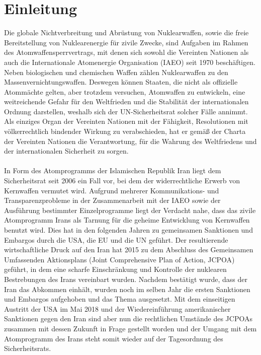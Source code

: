 \documentclass[a4paper,11pt]{article}
\begin{document}
	\section{Einleitung}
Die globale Nichtverbreitung und Abrüstung von Nuklearwaffen, sowie die freie Bereitstellung von Nuklearenergie für zivile Zwecke, sind Aufgaben im Rahmen des Atomwaffensperrvertrags, mit denen sich sowohl die Vereinten Nationen als auch die Internationale Atomenergie Organisation (IAEO) seit 1970 beschäftigen. Neben biologischen und chemischen Waffen zählen Nuklearwaffen zu den Massenvernichtungswaffen. Deswegen können Staaten, die nicht als offizielle Atommächte gelten, aber trotzdem versuchen, Atomwaffen zu entwickeln, eine weitreichende Gefahr für den Weltfrieden und die Stabilität der internationalen Ordnung darstellen, weshalb sich der UN-Sicherheitsrat solcher Fälle annimmt. Als einziges Organ der Vereinten Nationen mit der Fähigkeit, Resolutionen mit völkerrechtlich bindender Wirkung zu verabschieden, hat er gemäß der Charta der Vereinten Nationen die Verantwortung, für die Wahrung des Weltfriedens und der internationalen Sicherheit zu sorgen.
\\ \\
In Form des Atomprogramms der Islamischen Republik Iran liegt dem Sicherheitsrat seit 2006 ein Fall vor, bei dem der widerrechtliche Erwerb von Kernwaffen vermutet wird. Aufgrund mehrerer Kommunikations- und Transparenzprobleme in der Zusammenarbeit mit der IAEO sowie der Ausführung bestimmter Einzelprogramme liegt der Verdacht nahe, dass das zivile Atomprogramm Irans als Tarnung für die geheime Entwicklung von Kernwaffen benutzt wird. Dies hat in den folgenden Jahren zu gemeinsamen Sanktionen und Embargos durch die USA, die EU und die UN geführt. Der resultierende wirtschaftliche Druck auf den Iran hat 2015 zu dem Abschluss des Gemeinsamen Umfassenden Aktionsplans (Joint Comprehensive Plan of Action, JCPOA) geführt, in dem eine scharfe Einschränkung und Kontrolle der nuklearen Bestrebungen des Irans vereinbart wurden. Nachdem bestätigt wurde, dass der Iran das Abkommen einhält, wurden noch im selben Jahr die ersten Sanktionen und Embargos aufgehoben und das Thema ausgesetzt. Mit dem einseitigen Austritt der USA im Mai 2018 und der Wiedereinführung amerikanischer Sanktionen gegen den Iran sind aber nun die rechtlichen Umstände des JCPOAs zusammen mit dessen Zukunft in Frage gestellt worden und der Umgang mit dem Atomprogramm des Irans steht somit wieder auf der Tagesordnung des Sicherheitsrats.
\end{document}
